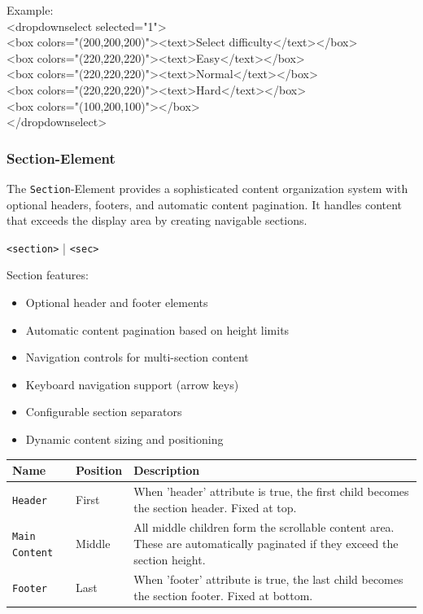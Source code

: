 \documentclass[a4paper,11pt]{article}
\begin{document}
Example:\\
<dropdownselect selected="1">\\
<box colors="(200,200,200)"><text>Select difficulty</text></box>\\
<box colors="(220,220,220)"><text>Easy</text></box>\\
<box colors="(220,220,220)"><text>Normal</text></box>\\
<box colors="(220,220,220)"><text>Hard</text></box>\\
<box colors="(100,200,100)"></box>\\
</dropdownselect>

\newpage
\hypertarget{section}{}
\subsubsection*{Section-Element}
The \texttt{Section}-Element provides a sophisticated content organization system with optional headers, footers, and automatic content pagination. It handles content that exceeds the display area by creating navigable sections.
\begin{center}
        	\texttt{<section>} | \texttt{<sec>}
\end{center}

Section features:
\begin{itemize}
    \item Optional header and footer elements
    \item Automatic content pagination based on height limits
    \item Navigation controls for multi-section content
    \item Keyboard navigation support (arrow keys)
    \item Configurable section separators
    \item Dynamic content sizing and positioning
\end{itemize}

\renewcommand{\arraystretch}{1.3}
\begin{tcolorbox}[colback=white, colframe=black!75, title=Child Elements]
\begin{tabularx}{\linewidth}{p{60pt}|p{110pt}|X}
	\textbf{Name} & \textbf{Position} & \textbf{Description}\\
\hline
	\texttt{Header} & First & When 'header' attribute is true, the first child becomes the section header. Fixed at top.\\
\rowcolor[HTML]{E8E8E8}
	\texttt{Main Content} & Middle & All middle children form the scrollable content area. These are automatically paginated if they exceed the section height.\\
	\texttt{Footer} & Last & When 'footer' attribute is true, the last child becomes the section footer. Fixed at bottom.\\
\end{tabularx}
\end{tcolorbox}
\end{document}
